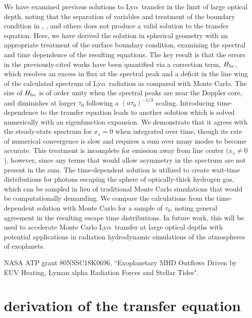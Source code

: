 \documentclass{aastex63}
\newcommand\lya{Ly$\alpha$\ }
\begin{document}
We have examined previous solutions to \lya transfer in the limit of large optical depth, noting that the separation of variables and treatment of the boundary condition in \cite{1973MNRAS.162...43H}, \cite{1990ApJ...350..216N}, \cite{2006ApJ...649...14D} and others does not produce a valid solution to the transfer equation. Here, we have derived the solution in spherical geometry with an appropriate treatment of the surface boundary condition, examining the spectral and time dependence of the resulting equations. The key result is that the errors in the previously-cited works have been quantified via a correction term, $H_{\rm bc}$, which resolves an excess in flux at the spectral peak and a deficit in the line wing of the calculated spectrum of \lya radiation as compared with Monte Carlo. The size of $H_{\rm bc}$ is of order unity when the spectral peaks are near the Doppler core, and diminishes at larger $\tau_0$ following a $(a\tau_0)^{-1/3}$ scaling. Introducing time-dependence to the transfer equation leads to another solution which is solved numerically with an eigenfunction expansion. We demonstrate that it agrees with the steady-state spectrum for $x_s=0$ when integrated over time, though its rate of numerical convergence is slow and requires a sum over many modes to become accurate. This treatment is incomplete for emission away from line center ($x_s\neq0$), however, since any terms that would allow asymmetry in the spectrum are not present in the sum. The time-dependent solution is utilized to create wait-time distributions for photons escaping the sphere of optically-thick hydrogen gas, which can be sampled in lieu of traditional Monte Carlo simulations that would be computationally demanding. We compare the calculations from the time-dependent solution with Monte Carlo for a sample of $\tau_0$, noting general agreement in the resulting escape time distributions. In future work, this will be used to accelerate Monte Carlo \lya transfer at large optical depths with potential applications in radiation hydrodynamic simulations of the atmospheres of exoplanets.

\acknowledgments

NASA ATP grant 80NSSC18K0696, ``Exoplanetary MHD Outflows Driven by EUV Heating, Lyman alpha Radiation Forces and Stellar Tides".
\restartappendixnumbering

\appendix
\section{ derivation of the transfer equation } \label{app:rteqn_derivation}
\end{document}

